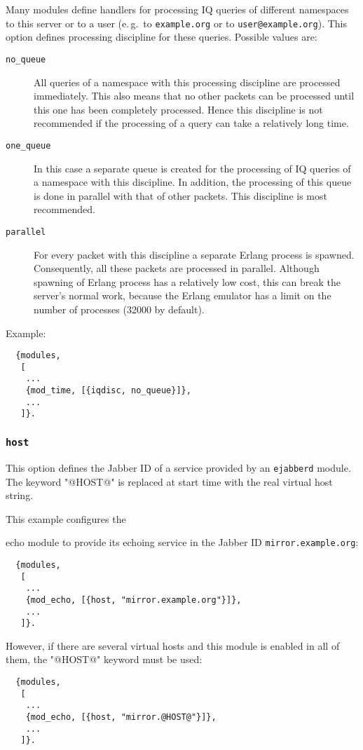 \documentclass[a4paper,10pt]{book}
\newcommand{\ind}[1]{\begin{latexonly}\index{#1}\end{latexonly}}
\newcommand{\bracehack}{\def\{{\char"7B}\def\}{\char"7D}}
\newcommand{\titem}[1]{\item[\bracehack\texttt{#1}]}
\newcommand{\jid}[1]{\texttt{#1}}
\newcommand{\option}[1]{\texttt{#1}}
\newcommand{\ejabberd}{\texttt{ejabberd}}
\newcommand{\module}[1]{\texttt{#1}}
\newcommand{\modecho}{\module{mod\_echo}}
\begin{document}
Many modules define handlers for processing IQ queries of different namespaces
to this server or to a user (e.\,g.\ to \jid{example.org} or to
\jid{user@example.org}). This option defines processing discipline for
these queries. Possible values are:
\begin{description}
\titem{no\_queue} All queries of a namespace with this processing discipline are
  processed immediately. This also means that no other packets can be processed
  until this one has been completely processed. Hence this discipline is not
  recommended if the processing of a query can take a relatively long time.
\titem{one\_queue} In this case a separate queue is created for the processing
  of IQ queries of a namespace with this discipline. In addition, the processing
  of this queue is done in parallel with that of other packets. This discipline
  is most recommended.
\titem{parallel} For every packet with this discipline a separate Erlang process
  is spawned. Consequently, all these packets are processed in parallel.
  Although spawning of Erlang process has a relatively low cost, this can break
  the server's normal work, because the Erlang emulator has a limit on the
  number of processes (32000 by default).
\end{description}

Example:
\begin{verbatim}
  {modules,
   [
    ...
    {mod_time, [{iqdisc, no_queue}]},
    ...
   ]}.
\end{verbatim}

\subsubsection{\option{host}}
\label{modhostoption}
\ind{options!host}

This option defines the Jabber ID of a service provided by an \ejabberd{} module.
The keyword "@HOST@" is replaced at start time with the real virtual host string.

This example configures
the \ind{modules!\modecho{}}echo module to provide its echoing service 
in the Jabber ID \jid{mirror.example.org}:
    \begin{verbatim}
  {modules,
   [
    ...
    {mod_echo, [{host, "mirror.example.org"}]},
    ...
   ]}.
\end{verbatim}

However, if there are several virtual hosts and this module is enabled in all of them,
the "@HOST@" keyword must be used:
    \begin{verbatim}
  {modules,
   [
    ...
    {mod_echo, [{host, "mirror.@HOST@"}]},
    ...
   ]}.
\end{verbatim}
\end{document}

